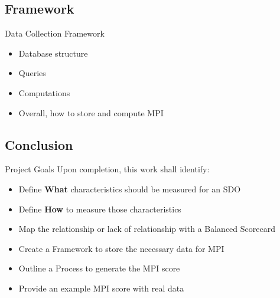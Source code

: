 \subsection{Framework}

\begin{frame}{Data Collection Framework}

    \begin{itemize}
        \item Database structure
        \item Queries
        \item Computations
        \item Overall, how to store and compute MPI
    \end{itemize}
\end{frame}

\subsection{Conclusion}

\begin{frame}{Project Goals}
    Upon completion, this work shall identify:
    \begin{itemize}
        \item Define \textbf{What} characteristics should be measured for an SDO
        \item Define \textbf{How} to measure those characteristics
        \item Map the relationship or lack of relationship with a Balanced Scorecard
        \item Create a Framework to store the necessary data for MPI
        \item Outline a Process to generate the MPI score
        \item Provide an example MPI score with real data
    \end{itemize}
\end{frame}




